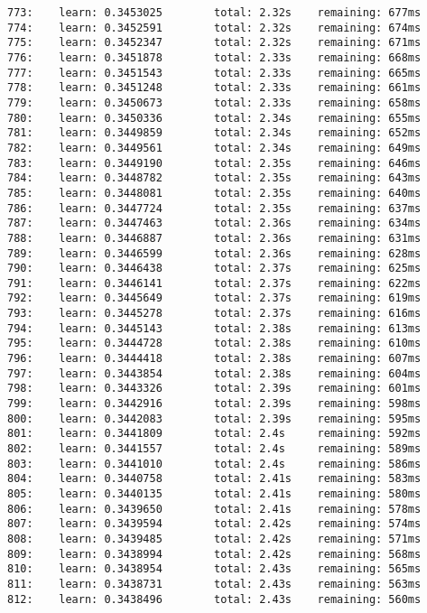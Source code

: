 \documentclass[11pt]{article}
\begin{document}
\begin{Verbatim}[commandchars=\\\{\}]
773:    learn: 0.3453025        total: 2.32s    remaining: 677ms
774:    learn: 0.3452591        total: 2.32s    remaining: 674ms
775:    learn: 0.3452347        total: 2.32s    remaining: 671ms
776:    learn: 0.3451878        total: 2.33s    remaining: 668ms
777:    learn: 0.3451543        total: 2.33s    remaining: 665ms
778:    learn: 0.3451248        total: 2.33s    remaining: 661ms
779:    learn: 0.3450673        total: 2.33s    remaining: 658ms
780:    learn: 0.3450336        total: 2.34s    remaining: 655ms
781:    learn: 0.3449859        total: 2.34s    remaining: 652ms
782:    learn: 0.3449561        total: 2.34s    remaining: 649ms
783:    learn: 0.3449190        total: 2.35s    remaining: 646ms
784:    learn: 0.3448782        total: 2.35s    remaining: 643ms
785:    learn: 0.3448081        total: 2.35s    remaining: 640ms
786:    learn: 0.3447724        total: 2.35s    remaining: 637ms
787:    learn: 0.3447463        total: 2.36s    remaining: 634ms
788:    learn: 0.3446887        total: 2.36s    remaining: 631ms
789:    learn: 0.3446599        total: 2.36s    remaining: 628ms
790:    learn: 0.3446438        total: 2.37s    remaining: 625ms
791:    learn: 0.3446141        total: 2.37s    remaining: 622ms
792:    learn: 0.3445649        total: 2.37s    remaining: 619ms
793:    learn: 0.3445278        total: 2.37s    remaining: 616ms
794:    learn: 0.3445143        total: 2.38s    remaining: 613ms
795:    learn: 0.3444728        total: 2.38s    remaining: 610ms
796:    learn: 0.3444418        total: 2.38s    remaining: 607ms
797:    learn: 0.3443854        total: 2.38s    remaining: 604ms
798:    learn: 0.3443326        total: 2.39s    remaining: 601ms
799:    learn: 0.3442916        total: 2.39s    remaining: 598ms
800:    learn: 0.3442083        total: 2.39s    remaining: 595ms
801:    learn: 0.3441809        total: 2.4s     remaining: 592ms
802:    learn: 0.3441557        total: 2.4s     remaining: 589ms
803:    learn: 0.3441010        total: 2.4s     remaining: 586ms
804:    learn: 0.3440758        total: 2.41s    remaining: 583ms
805:    learn: 0.3440135        total: 2.41s    remaining: 580ms
806:    learn: 0.3439650        total: 2.41s    remaining: 578ms
807:    learn: 0.3439594        total: 2.42s    remaining: 574ms
808:    learn: 0.3439485        total: 2.42s    remaining: 571ms
809:    learn: 0.3438994        total: 2.42s    remaining: 568ms
810:    learn: 0.3438954        total: 2.43s    remaining: 565ms
811:    learn: 0.3438731        total: 2.43s    remaining: 563ms
812:    learn: 0.3438496        total: 2.43s    remaining: 560ms

\end{Verbatim}
\end{document}
